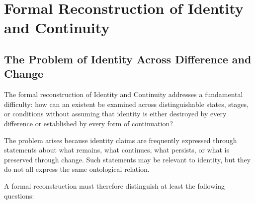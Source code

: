 %
%
%
%

\section{Formal Reconstruction of Identity and Continuity}
\label{sec:formal-reconstruction-of-identity-and-continuity}

\subsection{The Problem of Identity Across Difference and Change}

The formal reconstruction of Identity and Continuity
addresses a fundamental difficulty: how can an existent
be examined across distinguishable states, stages, or
conditions without assuming that identity is either
destroyed by every difference or established by every
form of continuation?

The problem arises because identity claims are frequently
expressed through statements about what remains, what
continues, what persists, or what is preserved through
change. Such statements may be relevant to identity, but
they do not all express the same ontological relation.

A formal reconstruction must therefore distinguish
at least the following questions:

